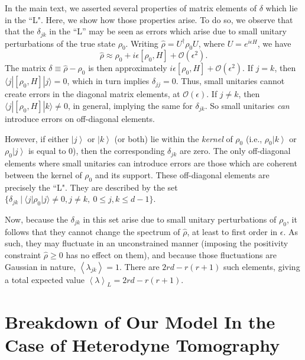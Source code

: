 \documentclass[aps,pra, twocolumn]{revtex4}
\newcommand{\ket}[1]{\ensuremath{\left|#1\right\rangle}}
\newcommand{\expect}[1]{\ensuremath{\left\langle#1\right\rangle}}
\newcommand{\rhohat}{\hat{\rho}}
\begin{document}
In the main text, we asserted several properties of matrix elements of $\delta$ which lie in the ``L". Here, we show how those properties arise. To do so, we observe that that the $\delta_{jk}$ in the ``L'' may be seen as errors which arise due to small unitary perturbations of the true state $\rho_{0}$. Writing $\rhohat = U^{\dagger}\rho_{0}U$, where $U=e^{i\epsilon H}$, we have
\[\rhohat \approx \rho_{0} + i\epsilon [\rho_{0},H]+\mathcal{O}(\epsilon^{2}).\]
The matrix $\delta \equiv \rhohat - \rho_{0}$ is then approximately $i\epsilon [\rho_{0},H]+\mathcal{O}(\epsilon^{2})$.
If $j = k$, then $\langle j|[\rho_{0}, H]|j\rangle= 0$, which in turn implies $\delta_{jj} = 0$. Thus, small unitaries cannot create errors in the diagonal matrix elements, at $\mathcal{O}(\epsilon)$. If $j \neq k$, then $\langle j|[\rho_{0}, H]|k\rangle \neq 0$, in general, implying the same for $\delta_{jk}$. So small unitaries \emph{can} introduce errors on off-diagonal elements.

However, if either $\ket{j}$ or $\ket{k}$ (or both) lie within the \emph{kernel} of $\rho_{0}$ (i.e., $\rho_{0}\ket{k}$ or $\rho_{0}\ket{j}$ is equal to 0), then the corresponding $\delta_{jk}$ are zero. The only off-diagonal elements where small unitaries can introduce errors are those which are coherent between the kernel of $\rho_{0}$ and its support. These off-diagonal elements are precisely the ``L". They are described by the set $\{\delta_{jk}~|~\langle j | \rho_{0}|j\rangle \neq 0, j\neq k, ~ 0 \leq j,k \leq d - 1\}$.

Now, because the $\delta_{jk}$ in this set arise due to small unitary perturbations of $\rho_{0}$, it follows that they cannot change the spectrum of $\rhohat$, at least to first order in $\epsilon$. As such, they may fluctuate in an unconstrained manner (imposing the positivity constraint $\rhohat \geq 0$ has no effect on them), and because those fluctuations are Gaussian in nature, $\expect{\lambda_{jk}}= 1$. There are $2rd-r(r+1)$ such elements, giving a total expected value $\expect{\lambda}_{L} = 2rd-r(r+1)$.


\section{Breakdown of Our Model In the Case of Heterodyne Tomography}
\label{app:breakdown}
\end{document}
